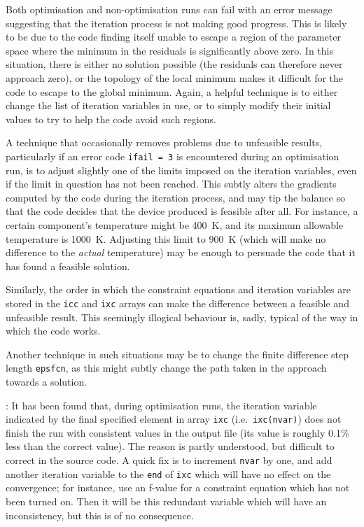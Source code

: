 \documentclass[11pt,a4paper]{report}
\begin{document}
Both optimisation and non-optimisation runs can fail with an error message
suggesting that the iteration process is not making good progress. This is
likely to be due to the code finding itself unable to escape a region of the
parameter space where the minimum in the residuals is significantly above
zero. In this situation, there is either no solution possible (the residuals
can therefore never approach zero), or the topology of the local minimum makes
it difficult for the code to escape to the global minimum. Again, a helpful
technique is to either change the list of iteration variables in use, or to
simply modify their initial values to try to help the code avoid such regions.

A technique that occasionally removes problems due to unfeasible results,
particularly if an error code \texttt{ifail = 3} is encountered during an
optimisation run, is to adjust slightly one of the limits imposed on the
iteration variables, even if the limit in question has not been reached. This
subtly alters the gradients computed by the code during the iteration process,
and may tip the balance so that the code decides that the device produced is
feasible after all. For instance, a certain component's temperature might be
400~K, and its maximum allowable temperature is 1000~K\@. Adjusting this limit
to 900~K (which will make no difference to the \textit{actual}\/ temperature)
may be enough to persuade the code that it has found a feasible solution.

Similarly, the order in which the constraint equations and iteration variables
are stored in the \texttt{icc} and \texttt{ixc} arrays can make the difference
between a feasible and unfeasible result. This seemingly illogical behaviour
is, sadly, typical of the way in which the code works.

Another technique in such situations may be to change the finite difference
step length \texttt{epsfcn}, as this might subtly change the path taken in the
approach towards a solution.

: It has been found that, during
optimisation runs, the iteration variable indicated by the final specified
element in array \texttt{ixc} (i.e.\ \texttt{ixc(nvar)}) does not finish the
run with consistent values in the output file (its value is roughly 0.1\% less
than the correct value). The reason is partly understood, but difficult to
correct in the source code. A quick fix is to increment \texttt{nvar} by one,
and add another iteration variable to the \texttt{end}\/ of \texttt{ixc} which
will have no effect on the convergence; for instance, use an f-value for a
constraint equation which has not been turned on. Then it will be this
redundant variable which will have an inconsistency, but this is of no
consequence.
\end{document}
